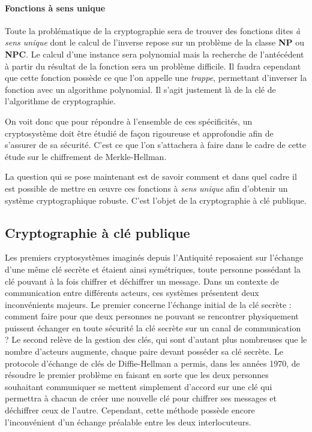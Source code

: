 \documentclass[a4paper,10pt]{article}
\begin{document}
\paragraph{Fonctions à sens unique} Toute la problématique de la cryptographie sera de trouver des fonctions dites \textit{à sens unique} dont le calcul de l'inverse repose sur un problème de la classe \textbf{NP} ou \textbf{NPC}. Le calcul d'une instance sera polynomial mais la recherche de l'antécédent à partir du résultat de la fonction sera un problème difficile. Il faudra cependant que cette fonction possède ce que l'on appelle une \textit{trappe}, permettant d'inverser la fonction avec un algorithme polynomial. Il s'agit justement là de la clé de l'algorithme de cryptographie.

On voit donc que pour répondre à l'ensemble de ces spécificités, un cryptosystème doit être étudié de façon rigoureuse et approfondie afin de s'assurer de sa sécurité. C'est ce que l'on s'attachera à faire dans le cadre de cette étude sur le chiffrement de Merkle-Hellman.

La question qui se pose maintenant est de savoir comment et dans quel cadre il est possible de mettre en œuvre ces fonctions à \textit{sens unique} afin d'obtenir un système cryptographique robuste. C'est l'objet de la cryptographie à clé publique.

\subsection*{Cryptographie à clé publique}

Les premiers cryptosystèmes imaginés depuis l'Antiquité reposaient sur l'échange d'une même clé secrète et étaient ainsi symétriques, toute personne possédant la clé pouvant à la fois chiffrer et déchiffrer un message. Dans un contexte de communication entre différents acteurs, ces systèmes présentent deux inconvénients majeurs. Le premier concerne l'échange initial de la clé secrète : comment faire pour que deux personnes ne pouvant se rencontrer physiquement puissent échanger en toute sécurité la clé secrète sur un canal de communication ? Le second relève de la gestion des clés, qui sont d'autant plus nombreuses que le nombre d'acteurs augmente, chaque paire devant posséder sa clé secrète. Le protocole d'échange de clés de Diffie-Hellman a permis, dans les années 1970, de résoudre le premier problème en faisant en sorte que les deux personnes souhaitant communiquer se mettent simplement d'accord sur une clé qui permettra à chacun de créer une nouvelle clé pour chiffrer ses messages et déchiffrer ceux de l'autre. Cependant, cette méthode possède encore l'inconvénient d'un échange préalable entre les deux interlocuteurs.
\end{document}
